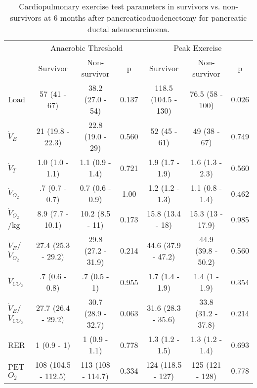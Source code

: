 \begin{sidewaystable}[p]
	\centering
	\caption{Cardiopulmonary exercise test parameters in survivors vs. non-survivors at 6 months after pancreaticoduodenectomy for pancreatic ductal adenocarcinoma. }
	\label{table:cpet_survival_6months}
	\begin{tabular}{l | c c c | c c c}
		                             &     \multicolumn{3}{c}{Anaerobic Threshold}      &        \multicolumn{3}{c}{Peak Exercise}         \\
		                             & Survivor            & Non-survivor       & p     & Survivor            & Non-survivor       & p     \\ \hline
		Load                         & 57 (41 - 67)        & 38.2 (27.0 - 54)   & 0.137 & 118.5 (104.5 - 130) & 76.5 (58 - 100)    & 0.026 \\
		$\dot{V}_E$                  & 21 (19.8 - 22.3)    & 22.8 (19.0 - 29)   & 0.560 & 52 (45 - 61)        & 49 (38 - 67)       & 0.749 \\
		$\dot{V}_T$                  & 1.0 (1.0 - 1.1)     & 1.1 (0.9 - 1.4)    & 0.721 & 1.9 (1.7 - 1.9)     & 1.6 (1.3 - 2.3)    & 0.560 \\
		$\dot{V}_{O_2}$              & .7 (0.7 - 0.7)      & 0.7 (0.6 - 0.9)    & 1.00  & 1.2 (1.2 - 1.3)     & 1.1 (0.8 - 1.4)    & 0.462 \\
		$\dot{V}_{O_2}$/kg           & 8.9 (7.7 - 10.1)    & 10.2 (8.5 - 11)    & 0.173 & 15.8 (13.4 - 18)    & 15.3 (13 - 17.9)   & 0.985 \\
		$\dot{V}_E$/$\dot{V}_{O_2}$  & 27.4 (25.3 - 29.2)  & 29.8 (27.2 - 31.9) & 0.214 & 44.6 (37.9 - 47.2)  & 44.9 (39.8 - 50.2) & 0.560 \\
		$\dot{V}_{CO_2}$             & .7 (0.6 - 0.8)      & .7 (0.5 - 1)       & 0.955 & 1.7 (1.4 - 1.9)     & 1.4 (1 - 1.9)      & 0.354 \\
		$\dot{V}_E$/$\dot{V}_{CO_2}$ & 27.7 (26.4 - 29.2)  & 30.7 (28.9 - 32.7) & 0.063 & 31.6 (28.3 - 35.6)  & 33.8 (31.2 - 37.8) & 0.214 \\
		RER                          & 1 (0.9 - 1)         & 1  (0.9 - 1.1)     & 0.778 & 1.3 (1.2 - 1.5)     & 1.3 (1.2 - 1.4)    & 0.693 \\
		PET$O_2$                     & 108 (104.5 - 112.5) & 113 (108 - 114.7)  & 0.334 & 124 (118.5 - 127)   & 125 (121 - 128)    & 0.778 \\

\end{tabular}
\end{sidewaystable}
